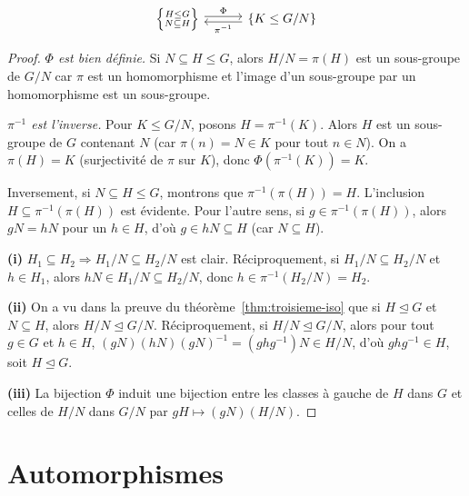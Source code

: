 \documentclass[12pt,a4paper,openany]{book}
\theoremstyle{definition}
\begin{document}
\[
\begin{tikzcd}[row sep=2.5em, column sep=3em]
  \left\{\substack{H\leq G \\ N\subseteq H}\right\}
    \arrow[r,shift left=0.5ex,"\Phi"]
  & \{K\leq G/N\}
    \arrow[l,shift left=0.5ex,"\pi^{-1}"]
\end{tikzcd}
\]

\begin{proof}
  \emph{$\Phi$ est bien définie.}
  Si $N\subseteq H\leq G$, alors $H/N = \pi(H)$ est un sous-groupe de
  $G/N$ car $\pi$ est un homomorphisme et l'image d'un sous-groupe par
  un homomorphisme est un sous-groupe.

  \medskip

  \emph{$\pi^{-1}$ est l'inverse.}
  Pour $K\leq G/N$, posons $H=\pi^{-1}(K)$. Alors $H$ est un
  sous-groupe de $G$ contenant $N$ (car $\pi(n)=N\in K$ pour tout
  $n\in N$). On a $\pi(H)=K$ (surjectivité de $\pi$ sur $K$), donc
  $\Phi(\pi^{-1}(K))=K$.

  Inversement, si $N\subseteq H\leq G$, montrons que
  $\pi^{-1}(\pi(H))=H$. L'inclusion $H\subseteq\pi^{-1}(\pi(H))$ est
  évidente. Pour l'autre sens, si $g\in\pi^{-1}(\pi(H))$, alors
  $gN=hN$ pour un $h\in H$, d'où $g\in hN\subseteq H$ (car
  $N\subseteq H$).

  \medskip

  \textbf{(i)} $H_1\subseteq H_2 \Rightarrow H_1/N\subseteq H_2/N$
  est clair. Réciproquement, si $H_1/N\subseteq H_2/N$ et $h\in H_1$,
  alors $hN\in H_1/N\subseteq H_2/N$, donc $h\in\pi^{-1}(H_2/N)=H_2$.

  \medskip

  \textbf{(ii)} On a vu dans la preuve du
  théorème~\ref{thm:troisieme-iso} que si $H\trianglelefteq G$ et
  $N\subseteq H$, alors $H/N\trianglelefteq G/N$. Réciproquement, si
  $H/N\trianglelefteq G/N$, alors pour tout $g\in G$ et $h\in H$,
  $(gN)(hN)(gN)^{-1} = (ghg^{-1})N\in H/N$, d'où $ghg^{-1}\in H$,
  soit $H\trianglelefteq G$.

  \medskip

  \textbf{(iii)} La bijection $\Phi$ induit une bijection entre les
  classes à gauche de $H$ dans $G$ et celles de $H/N$ dans $G/N$
  par $gH\mapsto (gN)(H/N)$.
\end{proof}

\section{Automorphismes}\label{sec:automorphismes}
\end{document}
